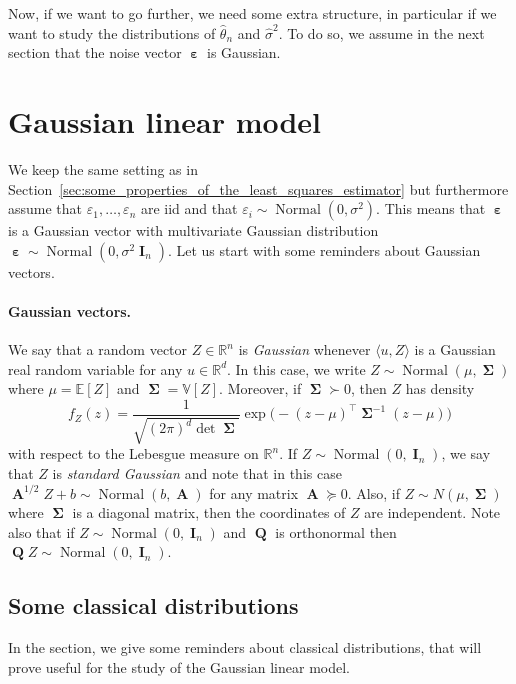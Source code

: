 \documentclass[
	fontsize=11pt, %
	twoside=false, %
	numbers=noenddot, %
]{kaobook}
\DeclareMathOperator{\bA}{{\boldsymbol A}}
\DeclareMathOperator{\bI}{{\boldsymbol I}}
\DeclareMathOperator{\bQ}{{\boldsymbol Q}}
\DeclareMathOperator{\beps}{\boldsymbol \varepsilon}
\DeclareMathOperator{\bSigma}{\boldsymbol \Sigma}
\DeclareMathOperator{\nor}{Normal}
\newcommand{\eps}{\varepsilon}
\newcommand{\E}{\mathbb E}
\newcommand{\R}{\mathbb R}
\newcommand{\var}{\mathbb V}
\newcommand{\wh}{\widehat}
\newcommand{\mgeq}{\succcurlyeq}
\newcommand{\inr}[1]{\langle #1 \rangle}
\begin{document}
Now, if we want to go further, we need some extra structure, in particular if we want to study the distributions of $\wh \theta_n$ and $\wh \sigma^2$. 
To do so, we assume in the next section that the noise vector $\beps$ is Gaussian.

\section{Gaussian linear model} %
\label{sec:gaussian_linear_model}


We keep the same setting as in Section~\ref{sec:some_properties_of_the_least_squares_estimator} but furthermore assume that $\eps_1, \ldots, \eps_n$ are iid and that $\eps_i \sim \nor(0, \sigma^2)$.
This means that $\beps$ is a Gaussian vector with multivariate Gaussian distribution $\beps \sim \nor(0, \sigma^2 \bI_n)$.
Let us start with some reminders about Gaussian vectors.

\paragraph{Gaussian vectors.} %

We say that a random vector $Z \in \R^n$ is \emph{Gaussian} whenever $\inr{u, Z}$ is a Gaussian real random variable for any $u \in \R^d$.
In this case, we write $Z \sim \nor(\mu, \bSigma)$ where $\mu = \E[Z]$ and $\bSigma = \var[Z]$.
Moreover, if $\bSigma \succ 0$, then $Z$ has density
\begin{equation*}
	f_Z(z) = \frac{1}{\sqrt{(2 \pi)^d \det \bSigma}} \exp \Big( - (z - \mu)^\top \bSigma^{-1} (z - \mu) \Big)
\end{equation*}
with respect to the Lebesgue measure on $\R^n$.
If $Z \sim \nor(0, \bI_n)$, we say that $Z$ is \emph{standard Gaussian} and note that in this case 
$\bA^{1/2} Z + b \sim \nor(b, \bA)$ for any matrix $\bA \mgeq 0$.
Also, if $Z \sim N(\mu, \bSigma)$ where $\bSigma$ is a diagonal matrix, then the coordinates of $Z$ are independent.
Note also that if $Z \sim \nor(0, \bI_n)$ and $\bQ$ is orthonormal then $\bQ Z \sim \nor(0, \bI_n)$.


\subsection{Some classical distributions} %
\label{sub:some_classical_distributions}

In the section, we give some reminders about classical distributions, that will prove useful for the study of the Gaussian linear model.
\end{document}
